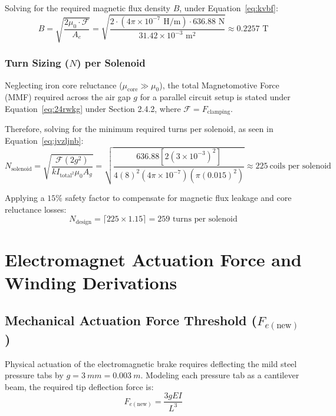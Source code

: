 Solving for the required magnetic flux density $B$, under Equation~\ref{eq:kvbf}:
\begin{equation}
	\label{eq:kvbf}
	B = \sqrt{\frac{2 \mu_0 \cdot \mathcal{F}}{A_e}} = \sqrt{\frac{2 \cdot (4\pi \times 10^{-7}\text{ H/m}) \cdot 636.88\text{ N}}{31.42 \times 10^{-3}\text{ m}^2}} \approx 0.2257\text{ T}
\end{equation}

\subsubsection{Turn Sizing ($N$) per Solenoid}
Neglecting iron core reluctance ($\mu_{\text{core}} \gg \mu_0$), the total Magnetomotive Force (MMF) required across the air gap $g$ for a parallel circuit setup is stated under Equation~\ref{eq:24rwkg} under Section 2.4.2, where $\mathcal{F}=F_{\text{clamping}}$.

Therefore, solving for the minimum required turns per solenoid, as seen in Equation~\ref{eq:jvzljnb}:
\begin{equation}
	\label{eq:jvzljnb}
	N_{\text{solenoid}} = \sqrt{\frac{\mathcal{F}(2g^2)}{kI_{\text{total}^2}\mu_0A_g}} = \sqrt{\frac{636.88[2(3\times10^{-3})^2]}{4(8)^2(4\pi \times10^{-7})(\pi(0.015)^2)}}\approx \SI{225}{\text{coils per solenoid}}
\end{equation}

Applying a $15\%$ safety factor to compensate for magnetic flux leakage and core reluctance losses:
\begin{equation}
	N_{\text{design}} = \lceil 225 \times 1.15 \rceil = 259\text{ turns per solenoid}
\end{equation}

\section{Electromagnet Actuation Force and Winding Derivations}
\label{app:winding_calc}

\subsection{Mechanical Actuation Force Threshold ($F_{e(\text{new})}$)}
Physical actuation of the electromagnetic brake requires deflecting the mild steel pressure tabs by $g = \SI{3}{mm} = \SI{0.003}{m}$. Modeling each pressure tab as a cantilever beam, the required tip deflection force is:
\begin{equation}
	F_{e(\text{new})} = \frac{3 g E I}{L^3}
\end{equation}

